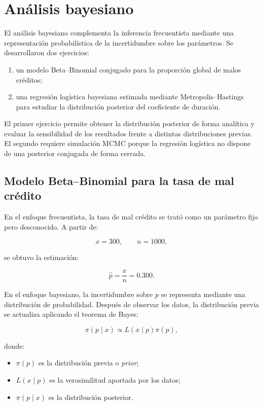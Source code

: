 \section{Análisis bayesiano}
\label{sec:bayes}

El análisis bayesiano complementa la inferencia frecuentista mediante una
representación probabilística de la incertidumbre sobre los parámetros.
Se desarrollaron dos ejercicios:

\begin{enumerate}
    \item un modelo Beta--Binomial conjugado para la proporción global de
    malos créditos;

    \item una regresión logística bayesiana estimada mediante
    Metropolis--Hastings para estudiar la distribución posterior del
    coeficiente de duración.
\end{enumerate}

El primer ejercicio permite obtener la distribución posterior de forma
analítica y evaluar la sensibilidad de los resultados frente a distintas
distribuciones previas. El segundo requiere simulación MCMC porque la
regresión logística no dispone de una posterior conjugada de forma
cerrada.

\subsection{Modelo Beta--Binomial para la tasa de mal crédito}
\label{subsec:beta-binomial}

En el enfoque frecuentista, la tasa de mal crédito se trató como un
parámetro fijo pero desconocido. A partir de:

\[
x=300,
\qquad
n=1000,
\]

se obtuvo la estimación:

\[
\widehat{p}
=
\frac{x}{n}
=
0.300.
\]

En el enfoque bayesiano, la incertidumbre sobre \(p\) se representa
mediante una distribución de probabilidad. Después de observar los datos,
la distribución previa se actualiza aplicando el teorema de Bayes:

\[
\pi(p\mid x)
\propto
L(x\mid p)\pi(p),
\]

donde:

\begin{itemize}
    \item \(\pi(p)\) es la distribución previa o \textit{prior};

    \item \(L(x\mid p)\) es la verosimilitud aportada por los datos;

    \item \(\pi(p\mid x)\) es la distribución posterior.
\end{itemize}

